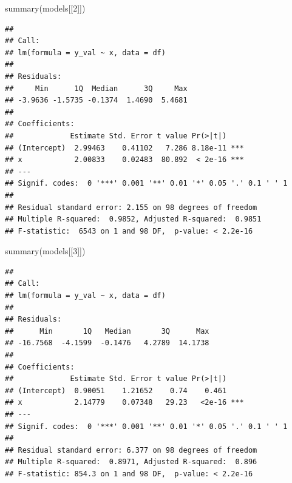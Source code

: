 \documentclass[
]{book}
\newenvironment{Shaded}{\begin{snugshade}}{\end{snugshade}}
\newcommand{\AttributeTok}[1]{\textcolor[rgb]{0.77,0.63,0.00}{#1}}
\newcommand{\ControlFlowTok}[1]{\textcolor[rgb]{0.13,0.29,0.53}{\textbf{#1}}}
\newcommand{\DecValTok}[1]{\textcolor[rgb]{0.00,0.00,0.81}{#1}}
\newcommand{\FunctionTok}[1]{\textcolor[rgb]{0.00,0.00,0.00}{#1}}
\newcommand{\NormalTok}[1]{#1}
\newcommand{\OtherTok}[1]{\textcolor[rgb]{0.56,0.35,0.01}{#1}}
\newcommand{\SpecialCharTok}[1]{\textcolor[rgb]{0.00,0.00,0.00}{#1}}
\begin{document}
\begin{Shaded}
\end{Shaded}

\begin{Shaded}
\begin{Highlighting}[]
\FunctionTok{summary}\NormalTok{(models[[}\DecValTok{2}\NormalTok{]])}
\end{Highlighting}
\end{Shaded}

\begin{verbatim}
## 
## Call:
## lm(formula = y_val ~ x, data = df)
## 
## Residuals:
##     Min      1Q  Median      3Q     Max 
## -3.9636 -1.5735 -0.1374  1.4690  5.4681 
## 
## Coefficients:
##             Estimate Std. Error t value Pr(>|t|)    
## (Intercept)  2.99463    0.41102   7.286 8.18e-11 ***
## x            2.00833    0.02483  80.892  < 2e-16 ***
## ---
## Signif. codes:  0 '***' 0.001 '**' 0.01 '*' 0.05 '.' 0.1 ' ' 1
## 
## Residual standard error: 2.155 on 98 degrees of freedom
## Multiple R-squared:  0.9852, Adjusted R-squared:  0.9851 
## F-statistic:  6543 on 1 and 98 DF,  p-value: < 2.2e-16
\end{verbatim}

\begin{Shaded}
\begin{Highlighting}[]
\FunctionTok{summary}\NormalTok{(models[[}\DecValTok{3}\NormalTok{]])}
\end{Highlighting}
\end{Shaded}

\begin{verbatim}
## 
## Call:
## lm(formula = y_val ~ x, data = df)
## 
## Residuals:
##      Min       1Q   Median       3Q      Max 
## -16.7568  -4.1599  -0.1476   4.2789  14.1738 
## 
## Coefficients:
##             Estimate Std. Error t value Pr(>|t|)    
## (Intercept)  0.90051    1.21652    0.74    0.461    
## x            2.14779    0.07348   29.23   <2e-16 ***
## ---
## Signif. codes:  0 '***' 0.001 '**' 0.01 '*' 0.05 '.' 0.1 ' ' 1
## 
## Residual standard error: 6.377 on 98 degrees of freedom
## Multiple R-squared:  0.8971, Adjusted R-squared:  0.896 
## F-statistic: 854.3 on 1 and 98 DF,  p-value: < 2.2e-16
\end{verbatim}
\end{document}
